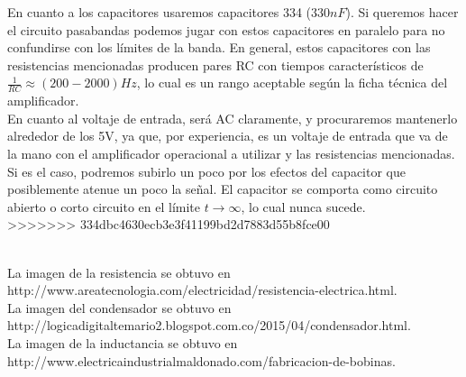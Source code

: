 \documentclass[prb,aps,preprintnumbers,amsmath,amssymb]{revtex4}
\begin{document}
En cuanto a los capacitores usaremos capacitores 334 ($330n F$). Si queremos hacer el circuito pasabandas podemos jugar con estos capacitores en paralelo para no confundirse con los límites de la banda. En general, estos capacitores con las resistencias mencionadas producen pares RC con tiempos característicos de $\frac{1}{RC} \approx (200-2000) Hz$, lo cual es un rango aceptable según la ficha técnica del amplificador.\\

En cuanto al voltaje de entrada, será AC claramente, y procuraremos mantenerlo alrededor de los 5V, ya que, por experiencia, es un voltaje de entrada que va de la mano con el amplificador operacional a utilizar y las resistencias mencionadas. Si es el caso, podremos subirlo un poco por los efectos del capacitor que posiblemente atenue un poco la señal. El capacitor se comporta como circuito abierto o corto circuito en el límite $t\rightarrow\infty$, lo cual nunca sucede.\\
>>>>>>> 334dbc4630ecb3e3f41199bd2d7883d55b8fce00

\begin{thebibliography}{99}
\
\\
 La imagen de la resistencia se obtuvo en http://www.areatecnologia.com/electricidad/resistencia-electrica.html.\\

 La imagen del condensador se obtuvo en http://logicadigitaltemario2.blogspot.com.co/2015/04/condensador.html.\\

 La imagen de la inductancia se obtuvo en http://www.electricaindustrialmaldonado.com/fabricacion-de-bobinas.\\


\end{thebibliography}
\end{document}
